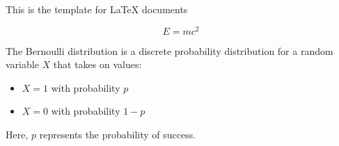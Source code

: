 \documentclass{article}
\begin{document}
This is the template for LaTeX documents

\[
E = mc^2
\]

The Bernoulli distribution is a discrete probability
distribution for a random variable $X$ that takes on values:

\begin{itemize}
    \item $X=1$ with probability $p$
    \item $X=0$ with probability $1 - p$ 
\end{itemize}

Here, $p$ represents the probability of success.
\end{document}
